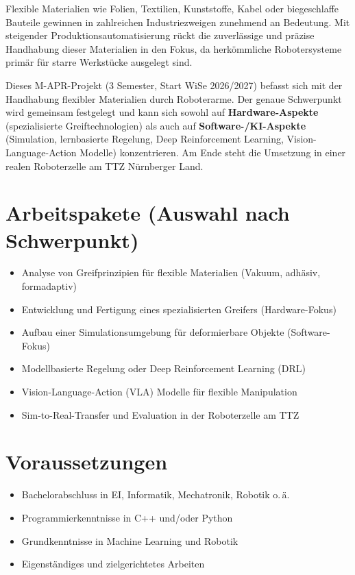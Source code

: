 \documentclass{ohm_project_description}
\begin{document}
\maketitle
\thispagestyle{fancy}

Flexible Materialien wie Folien, Textilien, Kunststoffe, Kabel oder biegeschlaffe Bauteile gewinnen in zahlreichen Industriezweigen zunehmend an Bedeutung. Mit steigender Produktionsautomatisierung rückt die zuverlässige und präzise Handhabung dieser Materialien in den Fokus, da herkömmliche Robotersysteme primär für starre Werkstücke ausgelegt sind.

Dieses M-APR-Projekt (3 Semester, Start WiSe 2026/2027) befasst sich mit der Handhabung flexibler Materialien durch Roboterarme. Der genaue Schwerpunkt wird gemeinsam festgelegt und kann sich sowohl auf \textbf{Hardware-Aspekte} (spezialisierte Greiftechnologien) als auch auf \textbf{Software-/KI-Aspekte} (Simulation, lernbasierte Regelung, Deep Reinforcement Learning, Vision-Language-Action Modelle) konzentrieren. Am Ende steht die Umsetzung in einer realen Roboterzelle am TTZ Nürnberger Land.

\section*{Arbeitspakete (Auswahl nach Schwerpunkt)}
\begin{itemize}[leftmargin=0.5cm]
    \setlength\itemsep{.1em}
    \item Analyse von Greifprinzipien für flexible Materialien (Vakuum, adhäsiv, formadaptiv)
    \item Entwicklung und Fertigung eines spezialisierten Greifers (Hardware-Fokus)
    \item Aufbau einer Simulationsumgebung für deformierbare Objekte (Software-Fokus)
    \item Modellbasierte Regelung oder Deep Reinforcement Learning (DRL)
    \item Vision-Language-Action (VLA) Modelle für flexible Manipulation
    \item Sim-to-Real-Transfer und Evaluation in der Roboterzelle am TTZ
\end{itemize}

\section*{Voraussetzungen}
\begin{itemize}[leftmargin=0.5cm]
    \setlength\itemsep{.1em}
    \item Bachelorabschluss in EI, Informatik, Mechatronik, Robotik o.\,ä.
    \item Programmierkenntnisse in C++ und/oder Python
    \item Grundkenntnisse in Machine Learning und Robotik
    \item Eigenständiges und zielgerichtetes Arbeiten
\end{itemize}
\end{document}
